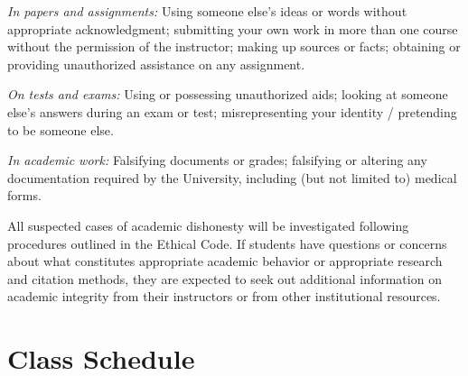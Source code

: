 \documentclass[11pt]{article}
\begin{document}
\smallskip
\noindent\textit{In papers and assignments:} Using someone else's ideas or words without appropriate
acknowledgment; submitting your own work in more than one course without the permission of the instructor;
making up sources or facts; obtaining or providing unauthorized assistance on any assignment.

\noindent\textit{On tests and exams:} Using or possessing unauthorized aids; looking at someone else's
answers during an exam or test; misrepresenting your identity / pretending to be someone else.

\noindent\textit{In academic work:} Falsifying documents or grades; falsifying or altering any documentation
required by the University, including (but not limited to) medical forms.

\smallskip
All suspected cases of academic dishonesty will be investigated following procedures outlined in the Ethical
Code. If students have questions or concerns about what constitutes appropriate academic behavior or
appropriate research and citation methods, they are expected to seek out additional information on academic
integrity from their instructors or from other institutional resources.

\clearpage

\section{Class Schedule}
\end{document}
